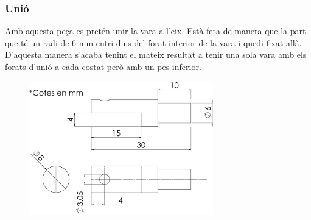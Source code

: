 \subsubsection{Unió}
Amb aquesta peça es pretén unir la vara a l'eix. Està feta de manera que la part que té un radi de 6 mm entri dins del forat interior de la vara i quedi fixat allà. D'aquesta manera s'acaba tenint el mateix resultat a tenir una sola vara amb els forats d'unió a cada costat però amb un pes inferior.
\begin{figure}[h!]
\centering
\includegraphics[width=8cm]{./sketch/unio}
\end{figure}


\newpage
